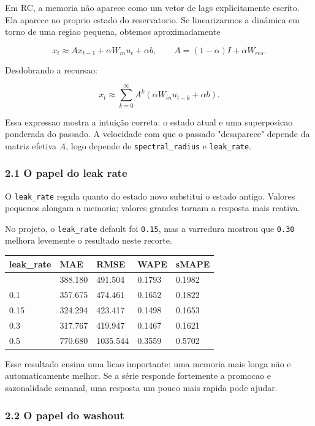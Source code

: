 \documentclass[12pt]{article}
\begin{document}
Em RC, a memoria não aparece como um vetor de lags explicitamente escrito. Ela aparece no proprio estado do reservatorio. Se linearizarmos a dinâmica em torno de uma regiao pequena, obtemos aproximadamente

\[
x_t \approx A x_{t-1} + \alpha W_{in} u_t + \alpha b,
\qquad
A = (1 - \alpha) I + \alpha W_{res}.
\]

Desdobrando a recursao:

\[
x_t \approx \sum_{k=0}^\infty A^k (\alpha W_{in} u_{t-k} + \alpha b).
\]

Essa expressao mostra a intuição correta: o estado atual e uma superposicao ponderada do passado. A velocidade com que o passado "desaparece" depende da matriz efetiva \(A\), logo depende de \texttt{spectral\_radius} e \texttt{leak\_rate}.

\subsubsection{2.1 O papel do leak rate}\label{21-o-papel-do-leak-rate}

O \texttt{leak\_rate} regula quanto do estado novo substitui o estado antigo. Valores pequenos alongam a memoria; valores grandes tornam a resposta mais reativa.

No projeto, o \texttt{leak\_rate} default foi \texttt{0.15}, mas a varredura mostrou que \texttt{0.30} melhora levemente o resultado neste recorte.

\begin{longtable}[]{@{}lllll@{}}
\toprule\noalign{}
leak\_rate & MAE & RMSE & WAPE & sMAPE \\
\midrule\noalign{}
\endhead
\bottomrule\noalign{}
\endlastfoot
0.05 & 388.180 & 491.504 & 0.1793 & 0.1982 \\
0.1 & 357.675 & 474.461 & 0.1652 & 0.1822 \\
0.15 & 324.294 & 423.417 & 0.1498 & 0.1653 \\
0.3 & 317.767 & 419.947 & 0.1467 & 0.1621 \\
0.5 & 770.680 & 1035.544 & 0.3559 & 0.5702 \\
\end{longtable}

Esse resultado ensina uma licao importante: uma memoria mais longa não e automaticamente melhor. Se a série responde fortemente a promocao e sazonalidade semanal, uma resposta um pouco mais rapida pode ajudar.

\subsubsection{2.2 O papel do washout}\label{22-o-papel-do-washout}
\end{document}
